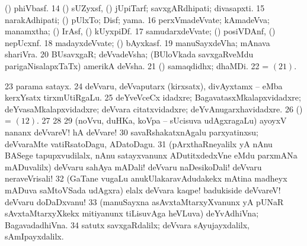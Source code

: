 {{ (\roVpu) phiVbasf.
\num{14}  (\girxVpu) sUZyxsf, (\roVpu) jUpiTarf;
savxgARdhipati; divasapxti. 
\num{15}  narakAdhipati;
(\girxVpu) pUlxTo; Disf; yama. 
\hypertarget{god pagu16}{}
\num{16}  perxVmadeVvate;
kAmadeVva; manamxtha; (\girxVpu) IrAsf, (\roVpu) kUyxpiDf. 
\num{17}  samudarxdeVvate; (\girxVpu) posiVDAnf, (\roVpu) nepUcxnf.
\num{18}  madayxdeVvate; (\girxVpu) bAyxkasf. 
\num{19}  manuSayxdeVha; mAnava shariVra. 
\num{20}  BUsavxgaR; deVvadeVsha; (BUloVkada
savxgaRveMdu parigaNisalapxTaTx) amerikA deVsha.
\hypertarget{god pagu21}{}
\num{21}  (\AmA) samaqdidhx; dhaMDi.
\num{22}  = \hyperlink{god pagu21}{\pagu $(21)$}. 
\num{23} 
parama satayx. 
\num{24}  deVvaru,
deVvaputarx (kirxsatx), divAyxtamx -- eMba kerxYsatx tirxmUtiRgaLu. 
\num{25}  deYveVceCx idadxre;
BagavatasxMkalapxvidadxre; deYvasaMkalapxvidadxre; deVvara citatxvidadxre; deYvAnugarxhavidadxre. 
\num{26}  (\pArxparx) = \hyperlink{god pagu12}{\pagu $(12)$}. 
\num{27} 
\num{28}  
\num{29}  (noVvu,
duHKa, koVpa -- sUcisuva udAgxragaLu) ayoyxV nananx deVvareV! hA deVvare! 
\num{30}  savaRshakatxnAgalu parxyatinxsu; deVvaraMte vatiRsatoDagu, ADatoDagu. 
\num{31}  (pArxthaRneyalilx yA nAnu
BASege tapupxvudilalx, nAnu satayxvanunx ADutitxdedxVne eMdu parxmANa
mADuvalilx) deVvaru sahAya mADali! deVvaru naDesikoDali! deVvaru neraveVrisali!
\num{32}  (GaTane \mo vugaLu anukUlakaravAdudakekx mAtina madheyx mADuva saMtoVSada udAgxra) elalx deVvara kaqpe! badukiside deVvareV! deVvaru
doDaDxvanu! 
\num{33}  (manuSayxna asAvxtaMtarxyXvanunx yA pUNaR
sAvxtaMtarxyXkekx mitiyanunx tiLisuvAga heVLuva) deYvAdhiVna; BagavadadhiVna.
\num{34}  satutx savxgaRdalilx; deVvara sAyujayxdalilx, sAmIpayxdalilx.}}

\noindent
\gl{\nuga}
\eentry

